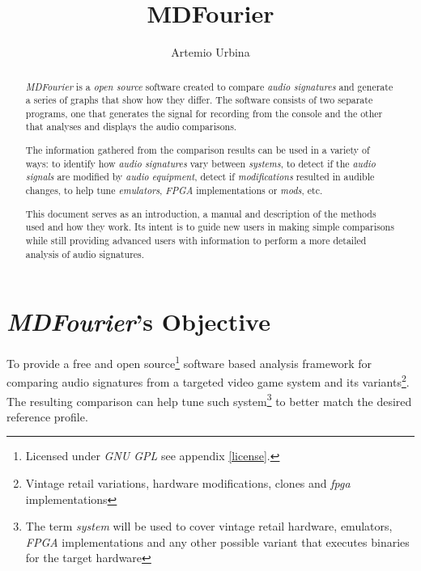 \documentclass[10pt,a4paper]{report}
\title{MDFourier}
\author{Artemio Urbina}
\begin{document}
	
\begin{titlepage}
	\maketitle
	\thispagestyle{empty}
\end{titlepage}

\begin{abstract}
\textit{MDFourier} is a \textit{open source} software created to compare \textit{audio signatures} and generate a series of graphs that show how they differ. The software consists of two separate programs, one that generates the signal for recording from the console and the other that analyses and displays the audio comparisons. 

The information gathered from the comparison results can be used in a variety of ways: to identify how \textit{audio signatures} vary between \textit{systems}, to detect if the \textit{audio signals} are modified by \textit{audio equipment}, detect if \textit{modifications} resulted in audible changes, to help tune \textit{emulators}, \textit{FPGA} implementations or \textit{mods}, etc.

This document serves as an introduction, a manual and description of the methods used and how they work. Its intent is to guide new users in making simple comparisons while still providing advanced users with information to perform a more detailed analysis of audio signatures.
\end{abstract}

\tableofcontents

\chapter{\textit{MDFourier}'s Objective}

To provide a free and open source\footnote{Licensed under \textit{GNU GPL} see appendix \ref{license}.} software based analysis framework for comparing audio signatures from a targeted video game system and its variants\footnote{Vintage retail variations, hardware modifications, clones and \textit{\acrfull{fpga}} implementations}. The resulting comparison can help tune such system\footnote{The term \textit{system} will be used to cover vintage retail hardware, emulators, \textit{FPGA} implementations and any other possible variant that executes binaries for the target hardware} to better match the desired reference profile.
\end{document}
